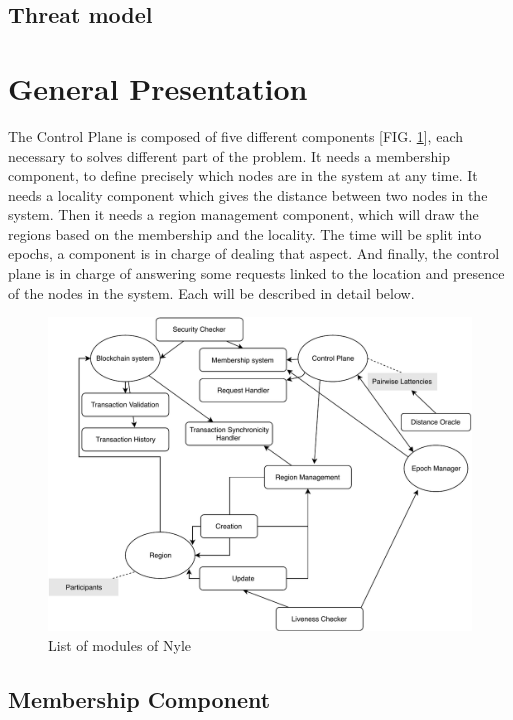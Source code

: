 \documentclass[a4paper,11pt,oneside]{report}
\begin{document}
\subsection{Threat model}

\section{General Presentation}

The Control Plane is composed of five different components [FIG.
\ref{fig:modules}], each necessary to solves different part of the problem. It
needs a membership component, to define precisely which nodes are in the system
at any time. It needs a locality component which gives the distance between two
nodes in the system. Then it needs a region management component, which will
draw the regions based on the membership and the locality. The time will be
split into epochs, a component is in charge of dealing that aspect. And
finally, the control plane is in charge of answering some requests linked to
the location and presence of the nodes in the system. Each will be described in
detail below. 

\begin{figure}[!h]
\centering
\includegraphics[width=400pt]{figures/Nyle_components}
\caption{List of modules of Nyle}
\label{fig:modules}
\end{figure}

\subsection{Membership Component}
\end{document}

